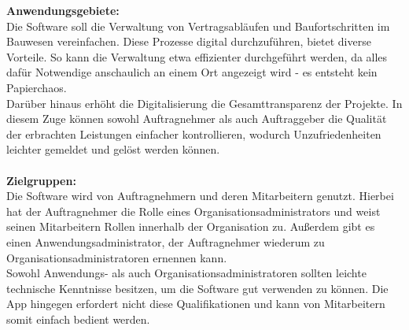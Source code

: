 %

\textbf{Anwendungsgebiete:}\\
Die Software soll die Verwaltung von Vertragsabläufen und Baufortschritten im Bauwesen vereinfachen.
Diese Prozesse digital durchzuführen, bietet diverse Vorteile.
So kann die Verwaltung etwa effizienter durchgeführt werden, da alles dafür Notwendige anschaulich an einem Ort angezeigt wird - es entsteht kein Papierchaos.\\
Darüber hinaus erhöht die Digitalisierung die Gesamttransparenz der Projekte.
In diesem Zuge können sowohl Auftragnehmer als auch Auftraggeber die Qualität der erbrachten Leistungen einfacher kontrollieren, wodurch Unzufriedenheiten leichter gemeldet und gelöst werden können.\\\\

\noindent \textbf{Zielgruppen:}\\
Die Software wird von Auftragnehmern und deren Mitarbeitern genutzt.
Hierbei hat der Auftragnehmer die Rolle eines Organisationsadministrators und weist seinen Mitarbeitern Rollen innerhalb der Organisation zu.
Außerdem gibt es einen Anwendungsadministrator, der Auftragnehmer wiederum zu Organisationsadministratoren ernennen kann.\\
Sowohl Anwendungs- als auch Organisationsadministratoren sollten leichte technische Kenntnisse besitzen, um die Software gut verwenden zu können.
Die App hingegen erfordert nicht diese Qualifikationen und kann von Mitarbeitern somit einfach bedient werden.
